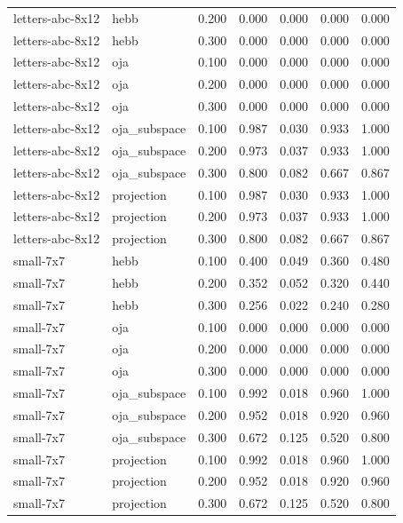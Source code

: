\begin{tabular}{llrrrrr}
letters-abc-8x12 & hebb & 0.200 & 0.000 & 0.000 & 0.000 & 0.000 \\
letters-abc-8x12 & hebb & 0.300 & 0.000 & 0.000 & 0.000 & 0.000 \\
letters-abc-8x12 & oja & 0.100 & 0.000 & 0.000 & 0.000 & 0.000 \\
letters-abc-8x12 & oja & 0.200 & 0.000 & 0.000 & 0.000 & 0.000 \\
letters-abc-8x12 & oja & 0.300 & 0.000 & 0.000 & 0.000 & 0.000 \\
letters-abc-8x12 & oja\_subspace & 0.100 & 0.987 & 0.030 & 0.933 & 1.000 \\
letters-abc-8x12 & oja\_subspace & 0.200 & 0.973 & 0.037 & 0.933 & 1.000 \\
letters-abc-8x12 & oja\_subspace & 0.300 & 0.800 & 0.082 & 0.667 & 0.867 \\
letters-abc-8x12 & projection & 0.100 & 0.987 & 0.030 & 0.933 & 1.000 \\
letters-abc-8x12 & projection & 0.200 & 0.973 & 0.037 & 0.933 & 1.000 \\
letters-abc-8x12 & projection & 0.300 & 0.800 & 0.082 & 0.667 & 0.867 \\
small-7x7 & hebb & 0.100 & 0.400 & 0.049 & 0.360 & 0.480 \\
small-7x7 & hebb & 0.200 & 0.352 & 0.052 & 0.320 & 0.440 \\
small-7x7 & hebb & 0.300 & 0.256 & 0.022 & 0.240 & 0.280 \\
small-7x7 & oja & 0.100 & 0.000 & 0.000 & 0.000 & 0.000 \\
small-7x7 & oja & 0.200 & 0.000 & 0.000 & 0.000 & 0.000 \\
small-7x7 & oja & 0.300 & 0.000 & 0.000 & 0.000 & 0.000 \\
small-7x7 & oja\_subspace & 0.100 & 0.992 & 0.018 & 0.960 & 1.000 \\
small-7x7 & oja\_subspace & 0.200 & 0.952 & 0.018 & 0.920 & 0.960 \\
small-7x7 & oja\_subspace & 0.300 & 0.672 & 0.125 & 0.520 & 0.800 \\
small-7x7 & projection & 0.100 & 0.992 & 0.018 & 0.960 & 1.000 \\
small-7x7 & projection & 0.200 & 0.952 & 0.018 & 0.920 & 0.960 \\
small-7x7 & projection & 0.300 & 0.672 & 0.125 & 0.520 & 0.800 \\
\bottomrule
\end{tabular}
